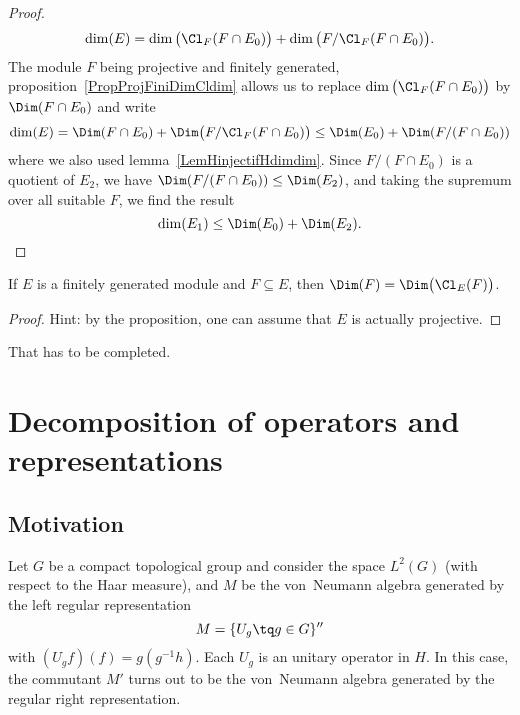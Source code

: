 \begin{proof}
\begin{equation}
	\dim(E)=\dim\big( \Cl_F(F\cap E_0) \big)+\dim\big( F/\Cl_F(F\cap E_0) \big).
\end{equation}
The module $F$ being projective and finitely generated, proposition~\ref{PropProjFiniDimCldim} allows us to replace $\dim\big( \Cl_F(F\cap E_0) \big)$ by $\Dim(F\cap E_0)$ and write
\begin{equation}
	\dim(E)=\Dim(F\cap E_0)+\Dim\big( F/\Cl_F(F\cap E_0) \big)\leq \Dim(E_0)+\Dim(F/(F\cap E_0))
\end{equation}
where we also used lemma~\ref{LemHinjectifHdimdim}. Since $F/(F\cap E_0)$ is a quotient of $E_2$, we have $\Dim(F/(F\cap E_0))\leq\Dim(E_2)$, and taking the supremum over all suitable $F$, we find the result
\begin{equation}
	\dim(E_1)\leq \Dim(E_0)+\Dim(E_2).
\end{equation}
\end{proof}

\begin{proposition}
If $E$ is a finitely generated module and $F\subseteq E$, then $\Dim(F)=\Dim\big(\Cl_E(F)\big)$.
\end{proposition}
\begin{proof}
Hint: by the proposition, one can assume that $E$ is actually projective.
\end{proof}
\begin{probleme}
 That has to be completed.
\end{probleme}
					\section{Decomposition of operators and representations}

					\subsection{Motivation}

Let $G$ be a compact topological group and consider the space $L^2(G)$ (with respect to the Haar measure), and $M$ be the von~Neumann algebra generated by the left regular representation
\begin{equation}
	M=\{ U_g\tq g\in G \}''
\end{equation}
with $(U_gf)(f)=g(g^{-1} h)$. Each $U_g$ is an unitary operator in $H$. In this case, the commutant $M'$ turns out to be the von~Neumann algebra generated by the regular right representation.

